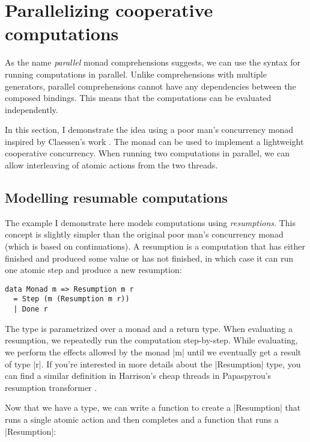 \documentclass{tmr}
\begin{document}

\section{Parallelizing cooperative computations}

As the name \textit{parallel} monad comprehensions suggests, we can use the syntax for 
running computations in parallel. Unlike comprehensions with multiple generators, parallel
comprehensions cannot have any dependencies between the composed bindings. This means that the 
computations can be evaluated independently. 

In this section, I demonstrate the idea using a poor man's concurrency monad inspired by Claessen's
work \cite{poorman}. The monad can be used to implement a lightweight cooperative concurrency. When 
running two computations in parallel, we can allow interleaving of atomic actions from the two 
threads.


\subsection{Modelling resumable computations}

The example I demonstrate here models computations using \textit{resumptions}. This concept is 
slightly simpler than the original poor man's concurrency monad (which is based on continuations). 
A resumption is a computation that has either finished and produced some value or has not
finished, in which case it can run one atomic step and produce a new resumption:

\begin{verbatim}
data Monad m => Resumption m r 
  = Step (m (Resumption m r))
  | Done r
\end{verbatim}
The type is parametrized over a monad and a return type. When evaluating a resumption, we 
repeatedly run the computation step-by-step. While evaluating, we perform the effects allowed by
the monad |m| until we eventually get a result of type |r|. If you're interested in more details 
about the |Resumption| type, you can find a similar definition in Harrison's cheap threads 
\cite{cheapthreads} in Papaspyrou's resumption transformer \cite{resmonad}.

Now that we have a type, we can write a function to create a |Resumption| that runs a single
atomic action and then completes and a function that runs a |Resumption|:
\end{document}
